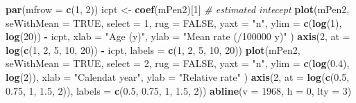 \documentclass[
]{book}
\newenvironment{Shaded}{\begin{snugshade}}{\end{snugshade}}
\newcommand{\AttributeTok}[1]{\textcolor[rgb]{0.13,0.29,0.53}{#1}}
\newcommand{\CommentTok}[1]{\textcolor[rgb]{0.56,0.35,0.01}{\textit{#1}}}
\newcommand{\ConstantTok}[1]{\textcolor[rgb]{0.56,0.35,0.01}{#1}}
\newcommand{\DecValTok}[1]{\textcolor[rgb]{0.00,0.00,0.81}{#1}}
\newcommand{\FloatTok}[1]{\textcolor[rgb]{0.00,0.00,0.81}{#1}}
\newcommand{\FunctionTok}[1]{\textcolor[rgb]{0.13,0.29,0.53}{\textbf{#1}}}
\newcommand{\NormalTok}[1]{#1}
\newcommand{\OtherTok}[1]{\textcolor[rgb]{0.56,0.35,0.01}{#1}}
\newcommand{\SpecialCharTok}[1]{\textcolor[rgb]{0.81,0.36,0.00}{\textbf{#1}}}
\newcommand{\StringTok}[1]{\textcolor[rgb]{0.31,0.60,0.02}{#1}}
\begin{document}
\begin{Shaded}
\begin{Highlighting}[]
\FunctionTok{par}\NormalTok{(}\AttributeTok{mfrow =} \FunctionTok{c}\NormalTok{(}\DecValTok{1}\NormalTok{, }\DecValTok{2}\NormalTok{))}
\NormalTok{icpt }\OtherTok{\textless{}{-}} \FunctionTok{coef}\NormalTok{(mPen2)[}\DecValTok{1}\NormalTok{] }\CommentTok{\#  estimated intecept}
\FunctionTok{plot}\NormalTok{(mPen2,}
  \AttributeTok{seWithMean =} \ConstantTok{TRUE}\NormalTok{, }\AttributeTok{select =} \DecValTok{1}\NormalTok{, }\AttributeTok{rug =} \ConstantTok{FALSE}\NormalTok{,}
  \AttributeTok{yaxt =} \StringTok{"n"}\NormalTok{, }\AttributeTok{ylim =} \FunctionTok{c}\NormalTok{(}\FunctionTok{log}\NormalTok{(}\DecValTok{1}\NormalTok{), }\FunctionTok{log}\NormalTok{(}\DecValTok{20}\NormalTok{)) }\SpecialCharTok{{-}}\NormalTok{ icpt,}
  \AttributeTok{xlab =} \StringTok{"Age (y)"}\NormalTok{, }\AttributeTok{ylab =} \StringTok{"Mean rate (/100000 y)"}
\NormalTok{)}
\FunctionTok{axis}\NormalTok{(}\DecValTok{2}\NormalTok{, }\AttributeTok{at =} \FunctionTok{log}\NormalTok{(}\FunctionTok{c}\NormalTok{(}\DecValTok{1}\NormalTok{, }\DecValTok{2}\NormalTok{, }\DecValTok{5}\NormalTok{, }\DecValTok{10}\NormalTok{, }\DecValTok{20}\NormalTok{)) }\SpecialCharTok{{-}}\NormalTok{ icpt, }\AttributeTok{labels =} \FunctionTok{c}\NormalTok{(}\DecValTok{1}\NormalTok{, }\DecValTok{2}\NormalTok{, }\DecValTok{5}\NormalTok{, }\DecValTok{10}\NormalTok{, }\DecValTok{20}\NormalTok{))}
\FunctionTok{plot}\NormalTok{(mPen2,}
  \AttributeTok{seWithMean =} \ConstantTok{TRUE}\NormalTok{, }\AttributeTok{select =} \DecValTok{2}\NormalTok{, }\AttributeTok{rug =} \ConstantTok{FALSE}\NormalTok{,}
  \AttributeTok{yaxt =} \StringTok{"n"}\NormalTok{, }\AttributeTok{ylim =} \FunctionTok{c}\NormalTok{(}\FunctionTok{log}\NormalTok{(}\FloatTok{0.4}\NormalTok{), }\FunctionTok{log}\NormalTok{(}\DecValTok{2}\NormalTok{)),}
  \AttributeTok{xlab =} \StringTok{"Calendat year"}\NormalTok{, }\AttributeTok{ylab =} \StringTok{"Relative rate"}
\NormalTok{)}
\FunctionTok{axis}\NormalTok{(}\DecValTok{2}\NormalTok{, }\AttributeTok{at =} \FunctionTok{log}\NormalTok{(}\FunctionTok{c}\NormalTok{(}\FloatTok{0.5}\NormalTok{, }\FloatTok{0.75}\NormalTok{, }\DecValTok{1}\NormalTok{, }\FloatTok{1.5}\NormalTok{, }\DecValTok{2}\NormalTok{)), }\AttributeTok{labels =} \FunctionTok{c}\NormalTok{(}\FloatTok{0.5}\NormalTok{, }\FloatTok{0.75}\NormalTok{, }\DecValTok{1}\NormalTok{, }\FloatTok{1.5}\NormalTok{, }\DecValTok{2}\NormalTok{))}
\FunctionTok{abline}\NormalTok{(}\AttributeTok{v =} \DecValTok{1968}\NormalTok{, }\AttributeTok{h =} \DecValTok{0}\NormalTok{, }\AttributeTok{lty =} \DecValTok{3}\NormalTok{)}
\end{Highlighting}
\end{Shaded}
\end{document}
